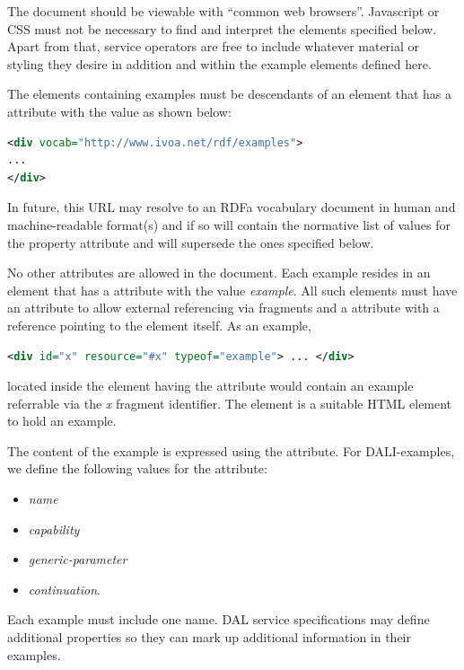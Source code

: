 \documentclass[11pt,letter]{ivoa}
\begin{document}
The document should be viewable with ``common web browsers''. Javascript or CSS 
must not be necessary to find and interpret the elements specified below.  Apart 
from that, service operators are free to include whatever material or styling 
they desire in addition and within the example elements defined here.

The elements containing examples must be descendants of an element that has a 
 attribute with the value as shown below:

\begin{lstlisting}[language=XML]
<div vocab="http://www.ivoa.net/rdf/examples">
...
</div>
\end{lstlisting}

In future, this URL may resolve to an RDFa vocabulary document in human and 
machine-readable format(s) and if so will contain the normative list of values 
for the property attribute and will supersede the ones specified below.

No other  attributes are allowed in the document. Each example resides in 
an element that has a  attribute with the value
\emph{example}. All such elements 
must have an  attribute to allow external referencing via fragments and a 
 attribute with a reference pointing to the element itself. As an 
example,

\begin{lstlisting}[language=XML]
<div id="x" resource="#x" typeof="example"> ... </div>
\end{lstlisting}

\noindent located inside the element having the  attribute would 
contain an example referrable via the \emph{x} fragment identifier. The
 element is 
a suitable HTML element to hold an example.

The content of the example is expressed using the  attribute. For 
DALI-examples, we define the following values for the  attribute: 

\begin{itemize}
\item \emph{name}
\item \emph{capability}
\item \emph{generic-parameter}
\item \emph{continuation}.
\end{itemize}

Each example must include one 
name.  DAL service specifications may define additional 
properties so they can mark up additional information in their examples.
\end{document}
